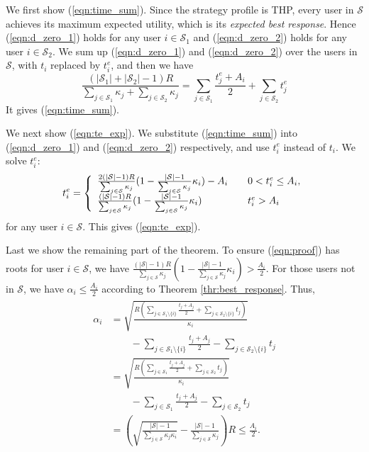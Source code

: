 \documentclass{IEEEtran}
\begin{document}
\begin{IEEEproof}
We first show (\ref{eqn:time_sum}). Since the strategy profile is THP, every user in $\mathcal{S}$ achieves its maximum expected utility, which is its \emph{expected best response}. Hence (\ref{eqn:d_zero_1}) holds for any user $i\in\mathcal{S}_1$ and (\ref{eqn:d_zero_2}) holds for any user $i\in\mathcal{S}_2$. We sum up (\ref{eqn:d_zero_1}) and (\ref{eqn:d_zero_2}) over the users in $\mathcal{S}$, with $t_i$ replaced by $t_i^{e}$, and then we have
\begin{equation}
\frac{(|\mathcal{S}_1|+|\mathcal{S}_2|-1)R}{\sum_{j\in\mathcal{S}_1}\kappa_j+\sum_{j\in\mathcal{S}_2}\kappa_j}=\sum_{j\in\mathcal{S}_1}\frac{t_j^{e}+A_i}{2}+\sum_{j\in\mathcal{S}_2}t_j^{e}
\end{equation}
It gives (\ref{eqn:time_sum}).\par{}
We next show (\ref{eqn:te_exp}). We substitute (\ref{eqn:time_sum}) into (\ref{eqn:d_zero_1}) and (\ref{eqn:d_zero_2}) respectively, and use $t_i^{e}$ instead of $t_i$. We solve $t_i^{e}$:
\begin{equation}
\label{eqn:proof}
t_i^{e}=\left\{
\begin{array}{l l}
\frac{2(|\mathcal{S}|-1)R}{\sum_{j\in\mathcal{S}}\kappa_j}(1-\frac{|\mathcal{S}|-1}{\sum_{j\in\mathcal{S}}\kappa_j}\kappa_i)-A_i & \quad \text{$0<t_i^{e}\leq A_i$,}\\
\frac{(|\mathcal{S}|-1)R}{\sum_{j\in\mathcal{S}}\kappa_j}(1-\frac{|\mathcal{S}|-1}{\sum_{j\in\mathcal{S}}\kappa_j}\kappa_i) & \quad \text{$t_i^{e}>A_i$}
\end{array}\right.
\end{equation}
for any user $i\in\mathcal{S}$. This gives (\ref{eqn:te_exp}).\par{}
Last we show the remaining part of the theorem. To ensure (\ref{eqn:proof}) has roots for user $i\in\mathcal{S}$, we have $\frac{(|\mathcal{S}|-1)R}{\sum_{j\in\mathcal{S}}\kappa_j}(1-\frac{|\mathcal{S}|-1}{\sum_{j\in\mathcal{S}}\kappa_j}\kappa_i)>\frac{A_i}{2}$. For those users not in $\mathcal{S}$, we have $\alpha_i \leq \frac{A_i}{2}$ according to Theorem \ref{thr:best_response}. Thus,
\begin{eqnarray}
\begin{aligned}
\alpha_i &= \sqrt{\frac{R(\sum_{j\in \mathcal{S}_1\setminus\{i\}}\frac{t_j+A_j}{2}+\sum_{j\in \mathcal{S}_2\setminus\{i\}}t_j)}{\kappa_i}}\\&\quad\quad-\sum_{j\in \mathcal{S}_1\setminus\{i\}}\frac{t_j+A_j}{2}-\sum_{j\in \mathcal{S}_2\setminus\{i\}}t_j\\
&= \sqrt{\frac{R(\sum_{j\in \mathcal{S}_1}\frac{t_j+A_j}{2}+\sum_{j\in \mathcal{S}_2}t_j)}{\kappa_i}}\\&\quad\quad-\sum_{j\in \mathcal{S}_1}\frac{t_j+A_j}{2}-\sum_{j\in \mathcal{S}_2}t_j\\
&= (\sqrt{\frac{|\mathcal{S}|-1}{\sum_{j\in\mathcal{S}}\kappa_j\kappa_i}}-\frac{|\mathcal{S}|-1}{\sum_{j\in\mathcal{S}}\kappa_j})R \leq\frac{A_i}{2}.
\end{aligned}
\end{eqnarray}
\end{IEEEproof}
\end{document}
